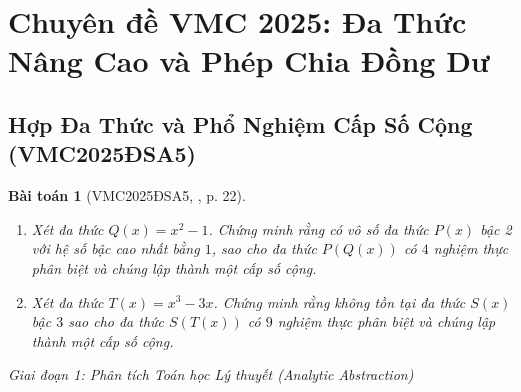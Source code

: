 \documentclass{article}
\newtheorem{baitoan}{Bài toán}
\begin{document}



\section{Chuyên đề VMC 2025: Đa Thức Nâng Cao và Phép Chia Đồng Dư}

\subsection{Hợp Đa Thức và Phổ Nghiệm Cấp Số Cộng (VMC2025ĐSA5)}

\begin{baitoan}[VMC2025ĐSA5, \cite{VMS_VMC2025}, p. 22]
\begin{enumerate}
    \item[(a)] Xét đa thức $Q(x) = x^2 - 1$. Chứng minh rằng có vô số đa thức $P(x)$ bậc 2 với hệ số bậc cao nhất bằng $1$, sao cho đa thức $P(Q(x))$ có $4$ nghiệm thực phân biệt và chúng lập thành một cấp số cộng.
    \item[(b)] Xét đa thức $T(x) = x^3 - 3x$. Chứng minh rằng không tồn tại đa thức $S(x)$ bậc $3$ sao cho đa thức $S(T(x))$ có $9$ nghiệm thực phân biệt và chúng lập thành một cấp số cộng.
\end{enumerate}
\end{baitoan}

\vspace{0.5em}\noindent\emph{Giai đoạn 1: Phân tích Toán học Lý thuyết (Analytic Abstraction)}
\end{document}
